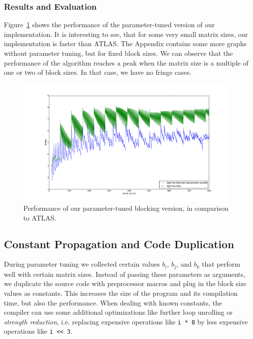 \documentclass[12pt]{article}
\begin{document}
\subsubsection{Results and Evaluation}
Figure~\ref{fig:param_results} shows the performance of the parameter-tuned version of our implementation. It is interesting to see, that for some very small matrix sizes, our implementation is faster than ATLAS. The Appendix contains some more graphs without parameter tuning, but for fixed block sizes. We can observe that the performance of the algorithm reaches a peak when the matrix size is a multiple of one or two of block sizes. In that case, we have no fringe cases.
\begin{figure}
	\includegraphics[width=\textwidth]{graphs/profiles/PROFILE_BLOCKED.pdf}
	\caption{Performance of our parameter-tuned blocking version, in comparison to ATLAS.}
	\label{fig:param_results}
\end{figure}


\subsection{Constant Propagation and Code Duplication}
During parameter tuning we collected certain values $b_i$, $b_j$, and $b_k$ that perform well with certain matrix sizes. Instead of passing these parameters as arguments, we duplicate the source code with preprocessor macros and plug in the block size values as constants. This increases the size of the program and its compilation time, but also the performance. When dealing with known constants, the compiler can use some additional optimizations like further loop unrolling or \emph{strength reduction}, i.e. replacing expensive operations like \lstinline{i * 8} by less expensive operations like \lstinline{i << 3}.
\end{document}
